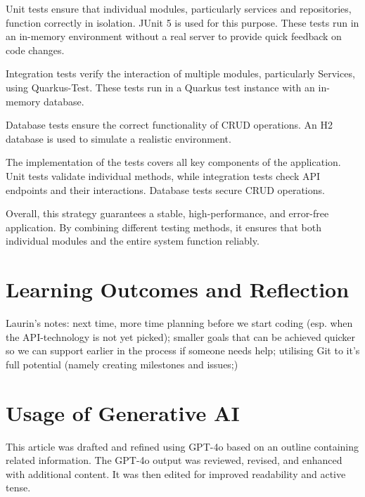 \documentclass[a4paper, 11pt]{article}
\begin{document}
Unit tests ensure that individual modules, particularly services and repositories, function correctly in isolation. JUnit 5 is used for this purpose. These tests run in an in-memory environment without a real server to provide quick feedback on code changes.

Integration tests verify the interaction of multiple modules, particularly Services, using Quarkus-Test. These tests run in a Quarkus test instance with an in-memory database.

Database tests ensure the correct functionality of CRUD operations. An H2 database is used to simulate a realistic environment.

The implementation of the tests covers all key components of the application. Unit tests validate individual methods, while integration tests check API endpoints and their interactions. Database tests secure CRUD operations.

Overall, this strategy guarantees a stable, high-performance, and error-free application. By combining different testing methods, it ensures that both individual modules and the entire system function reliably.


    \section{Learning Outcomes and Reflection}\label{sec:learning-outcomes-and-reflection}
    Laurin's notes: next time, more time planning before we start coding (esp. when the API-technology is not yet picked); smaller goals that can be achieved quicker so we can support earlier in the process if someone needs help; utilising Git to it's full potential (namely creating milestones and issues;)



    \section*{Usage of Generative AI}
    This article was drafted and refined using GPT-4o based on an outline containing related information. The GPT-4o output was reviewed, revised, and enhanced with additional content. It was then edited for improved readability and active tense.
\end{document}
